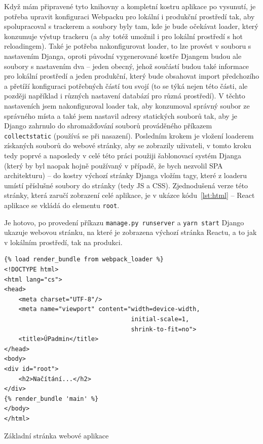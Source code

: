     Když mám připravené tyto knihovny a kompletní kostru aplikace po vysunutí, je potřeba upravit konfiguraci Webpacku pro lokální i produkční prostředí tak, aby spolupracoval s trackerem a soubory byly tam, kde je bude očekávat loader, který konzumuje výstup trackeru (a aby totéž umožnil i pro lokální prostředí s hot reloadingem). Také je potřeba nakonfigurovat loader, to lze provést v souboru s nastavením Djanga, oproti původní vygenerované kostře Djangem budou ale soubory s nastavením dva -- jeden obecný, jehož součástí budou také informace pro lokální prostředí a jeden produkční, který bude obsahovat import předchozího a přetíží konfiguraci potřebných částí tou svojí (to se týká nejen této části, ale později například i různých nastavení databází pro různá prostředí). V těchto nastaveních jsem nakonfiguroval loader tak, aby konzumoval správný soubor ze správného místa a také jsem nastavil adresy statických souborů tak, aby je Django zahrnulo do shromažďování souborů prováděného příkazem \verb|collectstatic| (používá se při nasazení). Posledním krokem je vložení loaderem získaných souborů do webové stránky, aby se zobrazily uživateli, v tomto kroku tedy poprvé a naposledy v celé této práci použiji šablonovací systém Djanga (který by byl naopak hojně používaný v případě, že bych nezvolil SPA architekturu) -- do kostry výchozí stránky Djanga vložím tagy, které z loaderu umístí příslušné soubory do stránky (tedy JS a CSS). Zjednodušená verze této stránky, která zaručí zobrazení celé aplikace, je v ukázce kódu~\ref{lst:html} -- React aplikace se vkládá do elementu \verb|root|. 
    
    Je hotovo, po provedení příkazu \verb|manage.py runserver| a \verb|yarn start| Django ukazuje webovou stránku, na které je zobrazena výchozí stránka Reactu, a to jak v lokálním prostředí, tak na produkci. 
    
    \begin{listing}[ht]
    	\begin{verbatim}
{% load render_bundle from webpack_loader %}
<!DOCTYPE html>
<html lang="cs">
<head>
    <meta charset="UTF-8"/>
    <meta name="viewport" content="width=device-width,
                                   initial-scale=1,
                                   shrink-to-fit=no">
    <title>ÚPadmin</title>
</head>
<body>
<div id="root">
    <h2>Načítání...</h2>
</div>
{% render_bundle 'main' %}
</body>
</html>
    	\end{verbatim}
    	\caption{Základní stránka webové aplikace}\label{lst:html}
    \end{listing}
    
